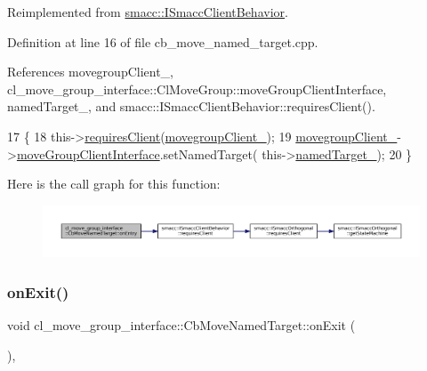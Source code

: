 Reimplemented from \hyperlink{classsmacc_1_1ISmaccClientBehavior_a3ec24a839087c550e1d62a81e48cf530}{smacc\+::\+I\+Smacc\+Client\+Behavior}.



Definition at line 16 of file cb\+\_\+move\+\_\+named\+\_\+target.\+cpp.



References movegroup\+Client\+\_\+, cl\+\_\+move\+\_\+group\+\_\+interface\+::\+Cl\+Move\+Group\+::move\+Group\+Client\+Interface, named\+Target\+\_\+, and smacc\+::\+I\+Smacc\+Client\+Behavior\+::requires\+Client().


\begin{DoxyCode}
17 \{
18     this->\hyperlink{classsmacc_1_1ISmaccClientBehavior_a32b16e99e3b4cb289414203dc861a440}{requiresClient}(\hyperlink{classcl__move__group__interface_1_1CbMoveNamedTarget_ab19a253b419bdbf3ec4b4b45a4198a65}{movegroupClient\_});
19     \hyperlink{classcl__move__group__interface_1_1CbMoveNamedTarget_ab19a253b419bdbf3ec4b4b45a4198a65}{movegroupClient\_}->\hyperlink{classcl__move__group__interface_1_1ClMoveGroup_a92922ea689e4e1b7b91512c56629c95b}{moveGroupClientInterface}.setNamedTarget(
      this->\hyperlink{classcl__move__group__interface_1_1CbMoveNamedTarget_a597a5afdcba0359aaa8d3f923fdfe133}{namedTarget\_});
20 \}
\end{DoxyCode}
Here is the call graph for this function\+:
\nopagebreak
\begin{figure}[H]
\begin{center}
\leavevmode
\includegraphics[width=350pt]{classcl__move__group__interface_1_1CbMoveNamedTarget_ab212edda280e896977d7ac567e4c1b29_cgraph}
\end{center}
\end{figure}
\mbox{\label{classcl__move__group__interface_1_1CbMoveNamedTarget_ae7e89742c903577b71790370714047d8}} 
\subsubsection{\texorpdfstring{on\+Exit()}{onExit()}}
{\footnotesize\ttfamily void cl\+\_\+move\+\_\+group\+\_\+interface\+::\+Cb\+Move\+Named\+Target\+::on\+Exit (\begin{DoxyParamCaption}{ }\end{DoxyParamCaption})\hspace{0.3cm}{\ttfamily [override]}, {\ttfamily [virtual]}}



